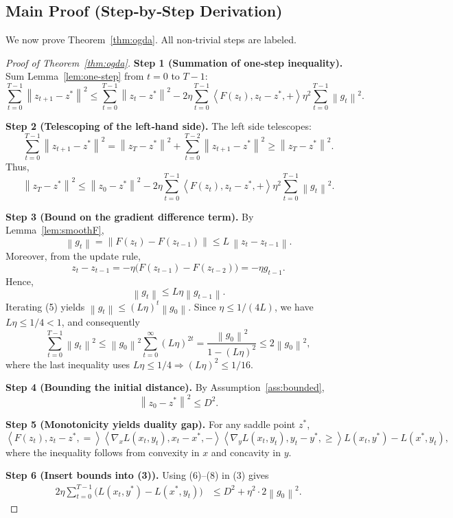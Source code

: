 \documentclass{article}
\newcommand{\norm}[1]{\left\|#1\right\|}
\newcommand{\inner}[2]{\left\langle #1,#2\right\rangle}
\begin{document}
\subsection*{Main Proof (Step‑by‑Step Derivation)}
We now prove Theorem~\ref{thm:ogda}.  
All non‑trivial steps are labeled.

\begin{proof}[Proof of Theorem~\ref{thm:ogda}]
\textbf{Step 1 (Summation of one‑step inequality).}  
Sum Lemma~\ref{lem:one-step} from $t=0$ to $T-1$:
\[
\sum_{t=0}^{T-1}\norm{z_{t+1}-z^*}^{2}
\le\sum_{t=0}^{T-1}\norm{z_{t}-z^*}^{2}
-2\eta\sum_{t=0}^{T-1}\inner{F(z_t),z_t-z^*}
+\eta^{2}\sum_{t=0}^{T-1}\norm{g_t}^{2}. \tag{2}
\]

\textbf{Step 2 (Telescoping of the left‑hand side).}  
The left side telescopes:
\[
\sum_{t=0}^{T-1}\norm{z_{t+1}-z^*}^{2}
= \norm{z_{T}-z^*}^{2}
+ \sum_{t=0}^{T-2}\norm{z_{t+1}-z^*}^{2}
\ge \norm{z_{T}-z^*}^{2}.
\]
Thus,
\[
\norm{z_{T}-z^*}^{2}
\le\norm{z_{0}-z^*}^{2}
-2\eta\sum_{t=0}^{T-1}\inner{F(z_t),z_t-z^*}
+\eta^{2}\sum_{t=0}^{T-1}\norm{g_t}^{2}. \tag{3}
\]

\textbf{Step 3 (Bound on the gradient difference term).}  
By Lemma~\ref{lem:smoothF},
\[
\norm{g_t}
=\norm{F(z_t)-F(z_{t-1})}
\le L\,\norm{z_t-z_{t-1}}. \tag{4}
\]
Moreover, from the update rule,
\[
z_t-z_{t-1}= -\eta\bigl(F(z_{t-1})-F(z_{t-2})\bigr) = -\eta g_{t-1}.
\]
Hence,
\[
\norm{g_t}\le L\eta\norm{g_{t-1}}. \tag{5}
\]
Iterating (5) yields $\norm{g_t}\le (L\eta)^{t}\norm{g_{0}}$.  
Since $\eta\le 1/(4L)$, we have $L\eta\le 1/4<1$, and consequently
\[
\sum_{t=0}^{T-1}\norm{g_t}^{2}
\le \norm{g_{0}}^{2}\sum_{t=0}^{\infty}(L\eta)^{2t}
= \frac{\norm{g_{0}}^{2}}{1-(L\eta)^{2}}
\le 2\norm{g_{0}}^{2},\tag{6}
\]
where the last inequality uses $L\eta\le 1/4\Rightarrow (L\eta)^{2}\le 1/16$.

\textbf{Step 4 (Bounding the initial distance).}  
By Assumption~\ref{ass:bounded},
\[
\norm{z_{0}-z^*}^{2}\le D^{2}. \tag{7}
\]

\textbf{Step 5 (Monotonicity yields duality gap).}  
For any saddle point $z^*$,
\[
\inner{F(z_t),z_t-z^*}
= \inner{\nabla_x L(x_t,y_t),x_t-x^*}
-\inner{\nabla_y L(x_t,y_t),y_t-y^*}
\ge L(x_t,y^*)-L(x^*,y_t), \tag{8}
\]
where the inequality follows from convexity in $x$ and concavity in $y$.

\textbf{Step 6 (Insert bounds into (3)).}  
Using (6)–(8) in (3) gives
\[
\begin{aligned}
2\eta\sum_{t=0}^{T-1}\bigl(L(x_t,y^*)-L(x^*,y_t)\bigr)
&\le D^{2}
+ \eta^{2}\cdot 2\norm{g_{0}}^{2}.
\end{aligned}
\tag{9}
\]


\end{proof}
\end{document}
